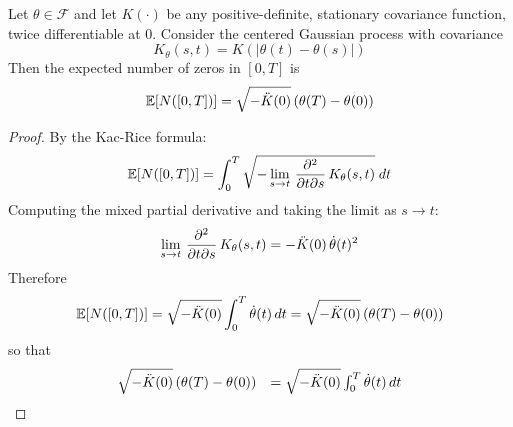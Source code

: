 \documentclass{mc}
\begin{document}
\begin{theorem}
  Let $\theta \in \mathcal{F}$ and let $K (\cdot)$ be any positive-definite,
  stationary covariance function, twice differentiable at $0$. Consider the
  centered Gaussian process with covariance
  \begin{equation}
    K_{\theta} (s, t) = K (| \theta (t) - \theta (s) |)
  \end{equation}
  Then the expected number of zeros in $[0, T]$ is
  \begin{equation}
    \mathbb{E} [N ([0, T])] = \sqrt{- \ddot{K} (0)}  \hspace{0.17em} (\theta
    (T) - \theta (0))
  \end{equation}
\end{theorem}

\begin{proof}
  By the Kac-Rice
  formula{\cite[10.3.1]{stationaryAndRelatedStochasticProcesses}}:
  \begin{equation}
    \mathbb{E} [N ([0, T])] = \int_0^T \sqrt{- \lim_{s \to t}  \hspace{0.17em}
    \frac{\partial^2}{\partial t \partial s}  \hspace{0.17em} K_{\theta} (s,
    t)}  \hspace{0.27em} dt
  \end{equation}
  Computing the mixed partial derivative and taking the limit as $s \to t$:
  \begin{equation}
    \lim_{s \to t}  \hspace{0.17em} \frac{\partial^2}{\partial t \partial s} 
    \hspace{0.17em} K_{\theta} (s, t) = - \ddot{K} (0) \hspace{0.17em}
    \dot{\theta} (t)^2
  \end{equation}
  Therefore
  \begin{equation}
    \mathbb{E} [N ([0, T])] = \sqrt{- \ddot{K} (0)}  \int_0^T \dot{\theta} (t)
    \hspace{0.17em} dt = \sqrt{- \ddot{K} (0)}  \hspace{0.17em} (\theta (T) -
    \theta (0))
  \end{equation}
  so that
  \begin{equation}
    \begin{array}{ll}
      \sqrt{- \ddot{K} (0)}  \hspace{0.17em} (\theta (T) - \theta (0)) & =
      \sqrt{- \ddot{K} (0)}  \int_0^T \dot{\theta} (t)  \hspace{0.17em} dt\\

\end{array}
\end{equation}
\end{proof}
\end{document}
